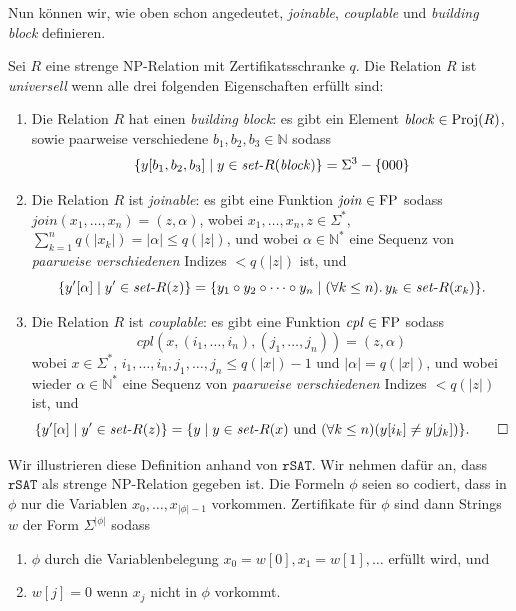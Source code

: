 Nun können wir, wie oben schon angedeutet, \emph{joinable}, \emph{couplable} und \emph{building block} definieren.
\begin{definition}
    Sei $R$ eine strenge NP-Relation mit Zertifikatsschranke $q$.
    Die Relation $R$ ist \emph{universell} wenn alle drei folgenden Eigenschaften erfüllt sind:
    \begin{enumerate}
        \item Die Relation $R$ hat einen \emph{building block}:  es gibt ein Element $\mathit{block}\in\operatorname{Proj}(R)$, sowie paarweise verschiedene $b_1,b_2,b_3\in\mathbb N$ sodass
            \[\{ y[b_1,b_2,b_3] \mid y\in \mathit{set}\text{-}{}R(\mathit{block}) \} = \Sigma^3 - \{000\} \]
        \item Die Relation $R$ ist \emph{joinable}: es gibt eine Funktion $\mathit{join}\in \mathrm{FP}$ sodass
           $ \mathit{join}(x_1, \dots, x_n) = (z, \alpha)$, wobei $x_1, \ldots, x_n, z\in \Sigma^*$, $\sum_{k=1}^n q(|x_k|)=|\alpha|\leq q(|z|)$, und
            wobei $\alpha\in \mathbb N^*$ eine Sequenz von \emph{paarweise verschiedenen} Indizes $<q(|z|)$ ist, und
            \begin{equation*} \{ y'[\alpha] \mid y' \in \mathit{set}\text{-}{}R(z)\} = \{ y_1\circ y_2 \circ \cdots \circ y_n \mid (\forall k\leq n).\, y_k \in \mathit{set}\text{-}{}R(x_k) \}. \end{equation*}
        \item Die Relation $R$ ist \emph{couplable}: es gibt eine Funktion $\mathit{cpl}\in \mathrm{FP}$ sodass
            \[  \mathit{cpl}(x, (i_1, \ldots, i_n), (j_1, \ldots, j_n)) = (z, \alpha) \]
        wobei $x\in\Sigma^*$, $i_1, \ldots, i_n, j_1,\ldots, j_n \leq q(|x|)-1$ und $|\alpha|=q(|x|)$, und
            wobei wieder $\alpha\in \mathbb N^*$ eine Sequenz von \emph{paarweise verschiedenen} Indizes $<q(|z|)$ ist, und
            \begin{equation*} \{ y'[\alpha] \mid y'\in \mathit{set}\text{-}{}R(z) \} = \{ y \mid y\in \mathit{set}\text{-}{}R(x) \text{ und } (\forall k\leq n)(y[i_k]\neq y[j_k]) \}. \qedhere \end{equation*}
    \end{enumerate}
\end{definition}
Wir illustrieren diese Definition anhand von $\mathtt{rSAT}$. 
Wir nehmen dafür an, dass $\mathtt{rSAT}$ als strenge NP-Relation gegeben ist. Die Formeln $\phi$ seien so codiert, dass in $\phi$ nur die Variablen $x_0, \dots, x_{|\phi|-1}$ vorkommen.
Zertifikate für $\phi$ sind dann Strings $w$ der Form $\Sigma^{|\phi|}$ sodass 
\begin{enumerate}[nosep]
    \item $\phi$ durch die Variablenbelegung $x_0=w[0], x_1=w[1], \dots$ erfüllt wird, und
    \item $w[j]=0$ wenn $x_j$ nicht in $\phi$ vorkommt.
\end{enumerate}

